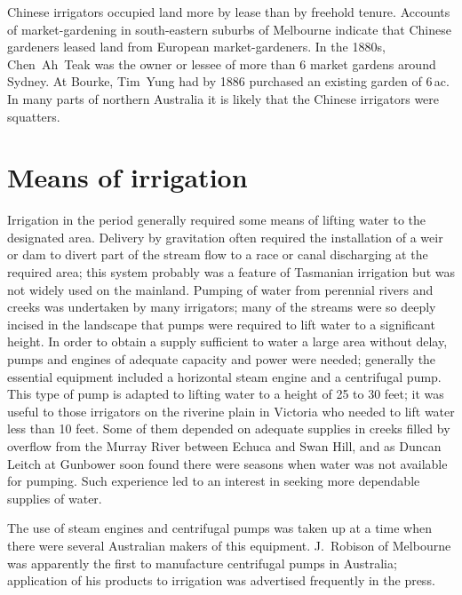 Chinese irrigators occupied land more by lease than by freehold
tenure.  Accounts of market-gardening in south-eastern suburbs of
Melbourne indicate that Chinese gardeners leased land from European
market-gardeners.  In the 1880s, Chen~Ah~Teak was the owner or lessee
of more than 6 market gardens around Sydney.  At Bourke, Tim~Yung had by 1886 purchased an
existing garden of 6\,ac.  In many parts of
northern Australia it is likely that the Chinese irrigators were
squatters.

\section*{Means of irrigation}

Irrigation in the period generally required some means of lifting
water to the designated area.  Delivery by gravitation often required
the installation of a weir or dam to divert part of the stream flow to
a race or canal discharging at the required area; this system probably
was a feature of Tasmanian irrigation but was not widely used on the
mainland.  Pumping of water from perennial rivers and creeks was
undertaken by many irrigators; many of the streams were so deeply
incised in the landscape that pumps were required to lift water to a
significant height.  In order to obtain a supply sufficient to water a
large area without delay, pumps and engines of adequate capacity and
power were needed; generally the essential equipment included a
horizontal steam engine and a centrifugal pump.  This type of pump is
adapted to lifting water to a height of 25 to 30 feet; it was useful
to those irrigators on the riverine plain in Victoria who needed to
lift water less than 10 feet.  Some of them depended on adequate
supplies in creeks filled by overflow from the Murray River between
Echuca and Swan Hill, and as Duncan Leitch at Gunbower soon found
there were seasons when water was not available for pumping.  Such
experience led to an interest in seeking more dependable supplies of
water.

The use of steam engines and centrifugal pumps was taken up at a time
when there were several Australian makers of this equipment.
J.~Robison of Melbourne was apparently the first to manufacture
centrifugal pumps in Australia; application of his products to
irrigation was advertised frequently in the
press.

